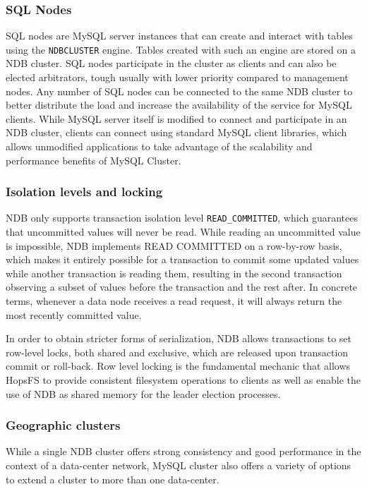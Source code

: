 \subsubsection{SQL Nodes}
SQL nodes are MySQL server instances that can create and interact with tables using the \texttt{NDBCLUSTER} engine.
Tables created with such an engine are stored on a NDB cluster.
SQL nodes participate in the cluster as clients and can also be elected arbitrators, tough usually with lower priority compared to management nodes.
Any number of SQL nodes can be connected to the same NDB cluster to better distribute the load and increase the availability of the service for MySQL clients.
While MySQL server itself is modified to connect and participate in an NDB cluster, clients can connect using standard MySQL client libraries, which allows unmodified applications to take advantage of the scalability and performance benefits of MySQL Cluster.

\subsubsection{Isolation levels and locking}
NDB only supports transaction isolation level \texttt{READ\_COMMITTED}, which guarantees that uncommitted values will never be read.
While reading an uncommitted value is impossible, NDB implements READ COMMITTED on a row-by-row basis, which makes it entirely possible for a transaction to commit some updated values while another transaction is reading them, resulting in the second transaction observing a subset of values before the transaction and the rest after.
In concrete terms, whenever a data node receives a read request, it will always return the most recently committed value.

In order to obtain stricter forms of serialization, NDB allows transactions to set row-level locks, both shared and exclusive, which are released upon transaction commit or roll-back.
Row level locking is the fundamental mechanic that allows HopsFS to provide consistent filesystem operations to clients as well as enable the use of NDB as shared memory for the leader election processes.

\subsubsection{Geographic clusters}
While a single NDB cluster offers strong consistency and good performance in the context of a data-center network, MySQL cluster also offers a variety of options to extend a cluster to more than one data-center.

